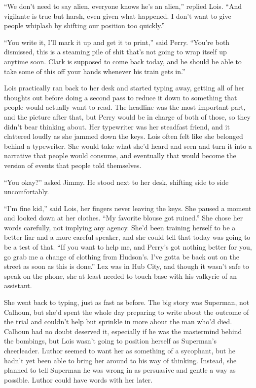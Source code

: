 ``We don't need to say alien, everyone knows he's an alien,'' replied
Lois. ``And vigilante is true but harsh, even given what happened. I
don't want to give people whiplash by shifting our position too
quickly.''

``You write it, I'll mark it up and get it to print,'' said Perry.
``You're both dismissed, this is a steaming pile of shit that's not
going to wrap itself up anytime soon. Clark is supposed to come back
today, and he should be able to take some of this off your hands
whenever his train gets in.''

Lois practically ran back to her desk and started typing away, getting
all of her thoughts out before doing a second pass to reduce it down to
something that people would actually want to read. The headline was the
most important part, and the picture after that, but Perry would be in
charge of both of those, so they didn't bear thinking about. Her
typewriter was her steadfast friend, and it clattered loudly as she
jammed down the keys. Lois often felt like she belonged behind a
typewriter. She would take what she'd heard and seen and turn it into a
narrative that people would consume, and eventually that would become
the version of events that people told themselves.

``You okay?'' asked Jimmy. He stood next to her desk, shifting side to
side uncomfortably.

``I'm fine kid,'' said Lois, her fingers never leaving the keys. She
paused a moment and looked down at her clothes. ``My favorite blouse got
ruined.'' She chose her words carefully, not implying any agency. She'd
been training herself to be a better liar and a more careful speaker,
and she could tell that today was going to be a test of that. ``If you
want to help me, and Perry's got nothing better for you, go grab me a
change of clothing from Hudson's. I've gotta be back out on the street
as soon as this is done.'' Lex was in Hub City, and though it wasn't
safe to speak on the phone, she at least needed to touch base with his
valkyrie of an assistant.

She went back to typing, just as fast as before. The big story was
Superman, not Calhoun, but she'd spent the whole day preparing to write
about the outcome of the trial and couldn't help but sprinkle in more
about the man who'd died. Calhoun had no doubt deserved it, especially
if he was the mastermind behind the bombings, but Lois wasn't going to
position herself as Superman's cheerleader. Luthor seemed to want her as
something of a sycophant, but he hadn't yet been able to bring her
around to his way of thinking. Instead, she planned to tell Superman he
was wrong in as persuasive and gentle a way as possible. Luthor could
have words with her later.


